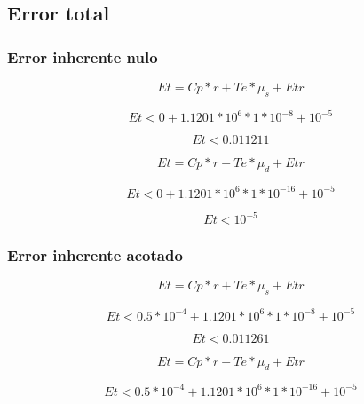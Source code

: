 \documentclass[11pt,a4paper]{article}
\begin{document}
\subsection{Error total}

\subsubsection{Error inherente nulo}

\begin{equation}
\label{errortotal}
 Et = Cp * r + Te * \mu_s + Etr 
\end{equation}

\begin{equation}
 Et < 0 + 1.1201*10^6 * 1*10^{-8} + 10^{-5}
\end{equation}

\begin{equation}
 Et < 0.011211
\end{equation}

\begin{equation}
  Et = Cp * r + Te * \mu_d + Etr 
\end{equation}

\begin{equation}
    Et < 0 + 1.1201*10^6 * 1*10^{-16} + 10^{-5}
\end{equation}

\begin{equation}
    Et < 10^{-5}
\end{equation}
  
\subsubsection{Error inherente acotado}

\begin{equation}
    Et = Cp * r + Te * \mu_s + Etr
\end{equation}

\begin{equation}
  Et < 0.5*10^{-4} + 1.1201*10^6 * 1*10^{-8} + 10^{-5}
\end{equation}

\begin{equation}
    Et < 0.011261
\end{equation}

\begin{equation}
    Et = Cp * r + Te * \mu_d + Etr 
\end{equation}

\begin{equation}
    Et < 0.5*10^{-4} + 1.1201*10^6 * 1*10^{-16} + 10^{-5}
\end{equation}
\end{document}
